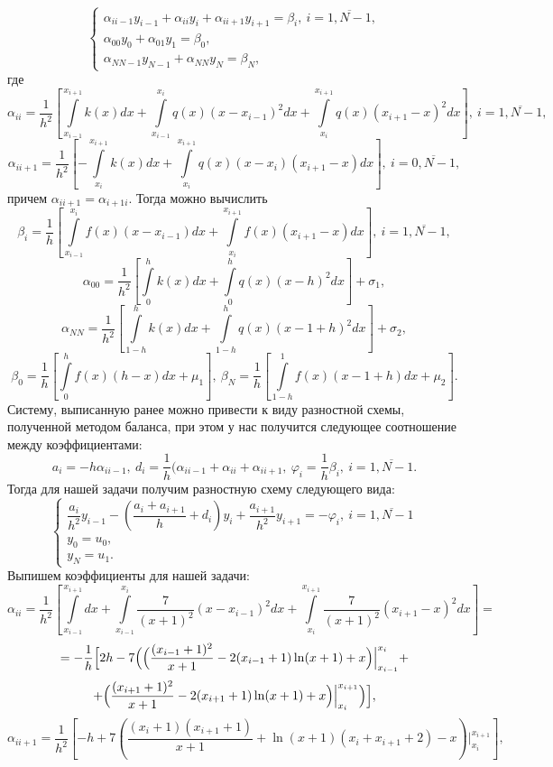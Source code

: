 \documentclass[11pt]{article}
\begin{document}
$$\begin{cases}
	\alpha_{ii-1} y_{i-1} + \alpha_{ii} y_i + \alpha_{i i+1} y_{i+1} = \beta_i,\ i = \overline {1, N -1},\\
	\alpha_{00} y_0 + \alpha_{01}y_1 = \beta_0,\\
	\alpha_{NN-1} y_{N-1} + \alpha_{NN}y_N = \beta_N,
\end{cases}$$
где 
$$\alpha_{ii} = \dfrac{1}{h^2}\left[ \int\limits_{x_{i-1}}^{x_{i+1}} k(x)dx +\int\limits_{x_{i-1}}^{x_i}q(x)(x-x_{i-1})^2dx + \int\limits_{x_i}^{x_{i+1}}q(x)(x_{i+1}-x)^2dx \right],\ i = \overline{1, N-1},$$
	$$\alpha_{ii+1} = \dfrac{1}{h^2} \left[-\int\limits_{x_i}^{x_{i+1}}k(x)dx + \int\limits_{x_i}^{x_{i+1}}q(x)(x-x_i)(x_{i+1} - x)dx\right],\ i = \overline {0, N-1},$$
 причем $\alpha_{ii+1}=\alpha_{i+1i}$. Тогда можно вычислить
 $$\beta_i = \dfrac{1}{h} \left[\int\limits_{x_{i-1}}^{x_i}f(x)(x-x_{i-1})dx + \int\limits_{x_i}^{x_{i+1}}f(x)(x_{i+1}-x)dx\right],\ i = \overline{1, N-1},$$
	$$\alpha_{00} = \dfrac{1}{h^2}\left[\int\limits_0^h k(x)dx + \int\limits_0^h q(x)(x-h)^2dx\right] + \sigma_1,$$
	$$\alpha_{NN} = \dfrac{1}{h^2}\left[\int\limits_{1-h}^h k(x)dx + \int\limits_{1-h}^h q(x)(x-1+h)^2dx\right] + \sigma_2,$$
	$$\beta_0 = \dfrac 1h \left[\int\limits_0^h f(x)(h-x)dx + \mu_1\right],\ \beta_N =  \dfrac{1}{h} \left[\int\limits_{1-h}^1 f(x)(x-1+h)dx + \mu_2\right].$$
 Систему, выписанную ранее можно привести к виду разностной схемы, полученной методом баланса, при этом у нас получится следующее соотношение между коэффициентами:
 $$a_i=-h\alpha_{ii-1},\ d_i=\frac{1}{h}(\alpha_{ii-1}+\alpha_{ii}+\alpha_{ii+1},\ \varphi_i=\frac{1}{h}\beta_i,\ i=\overline{1,N-1}.$$
 Тогда для нашей задачи получим разностную схему следующего вида:
$$\begin{cases}
	\dfrac{a_i}{h^2}y_{i-1} - \left(\dfrac{a_i +a_{i+1}}{h}+d_i\right)y_i + \dfrac{a_{i+1}}{h^2}y_{i+1} = -\varphi_i,\ i=\overline {1,N-1}\\
	y_0 = u_0,\\
	y_N=u_1.
\end{cases}$$
Выпишем коэффициенты для нашей задачи:
$$\alpha_{ii}=\dfrac{1}{h^2}\left[ \int\limits_{x_{i-1}}^{x_{i+1}}dx +\int\limits_{x_{i-1}}^{x_i}\frac{7}{(x+1)^2}(x-x_{i-1})^2dx + \int\limits_{x_i}^{x_{i+1}}\frac{7}{(x+1)^2}(x_{i+1}-x)^2dx \right]=$$$$=-\dfrac{1}{h}\Bigl[ 2h -7\Bigl(\Bigr( \frac{(x_{i-1}+1)^2}{x+1}-2 (x_{i-1}+1) \ln(x+1)+x\Bigl)\Big|_{x_{i-1}}^{x_i}+ $$$$ +\Bigr( \frac{(x_{i+1}+1)^2}{x+1}-2 (x_{i+1}+1) \ln(x+1)+x\Bigl)\Big|_{x_i}^{x_{i+1}}\Bigr) \Bigr],$$
$$\alpha_{ii+1} = \dfrac{1}{h^2} \left[-h + 7\left(\frac{(x_i+1) (x_{i+1}+1)}{x+1}+\ln(x+1) (x_i+x_{i+1}+2)-x\right)\Big|_{x_i}^{x_{i+1}}\right],$$
\end{document}
